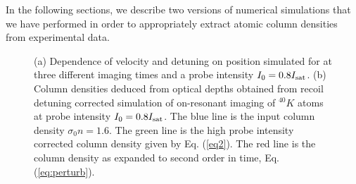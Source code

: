 In the following sections, we describe two versions of numerical simulations that we have performed in order to appropriately extract atomic column densities from experimental data.  
%
\begin{figure}
\caption[Recoil induced detuning]{(a) Dependence of velocity and detuning on position simulated for \K{} at three different imaging times and a probe intensity $I_0=0.8 I_{\rm sat}$. (b) Column densities deduced from optical depths obtained from recoil detuning corrected simulation of on-resonant imaging of $^{40}K$ atoms at probe intensity $I_0=0.8 I_{\rm sat}$. The blue line is the input column density $\sigma_0 n=1.6$. The green line is the high probe intensity corrected column density given by Eq. (\ref{eq2}). The red line is the column density as expanded to second order in time, Eq. (\ref{eq:perturb}).}
\label{fig:expos}
\end{figure}
